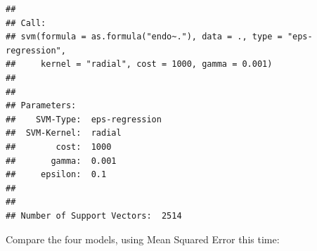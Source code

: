 \documentclass[]{article}
\newenvironment{Shaded}{\begin{snugshade}}{\end{snugshade}}
\newcommand{\KeywordTok}[1]{\textcolor[rgb]{0.13,0.29,0.53}{\textbf{#1}}}
\newcommand{\DataTypeTok}[1]{\textcolor[rgb]{0.13,0.29,0.53}{#1}}
\newcommand{\DecValTok}[1]{\textcolor[rgb]{0.00,0.00,0.81}{#1}}
\newcommand{\FloatTok}[1]{\textcolor[rgb]{0.00,0.00,0.81}{#1}}
\newcommand{\StringTok}[1]{\textcolor[rgb]{0.31,0.60,0.02}{#1}}
\newcommand{\CommentTok}[1]{\textcolor[rgb]{0.56,0.35,0.01}{\textit{#1}}}
\newcommand{\OperatorTok}[1]{\textcolor[rgb]{0.81,0.36,0.00}{\textbf{#1}}}
\newcommand{\NormalTok}[1]{#1}
\begin{document}
\begin{Shaded}
\end{Shaded}

\begin{verbatim}
## 
## Call:
## svm(formula = as.formula("endo~."), data = ., type = "eps-regression", 
##     kernel = "radial", cost = 1000, gamma = 0.001)
## 
## 
## Parameters:
##    SVM-Type:  eps-regression 
##  SVM-Kernel:  radial 
##        cost:  1000 
##       gamma:  0.001 
##     epsilon:  0.1 
## 
## 
## Number of Support Vectors:  2514
\end{verbatim}

Compare the four models, using Mean Squared Error this time:
\end{document}

